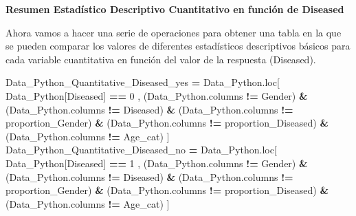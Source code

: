 \documentclass[
  11pt,
  a4paper,
]{article}
\newenvironment{Shaded}{\begin{snugshade}}{\end{snugshade}}
\newcommand{\DecValTok}[1]{\textcolor[rgb]{0.00,0.00,0.81}{#1}}
\newcommand{\NormalTok}[1]{#1}
\newcommand{\OperatorTok}[1]{\textcolor[rgb]{0.81,0.36,0.00}{\textbf{#1}}}
\newcommand{\StringTok}[1]{\textcolor[rgb]{0.31,0.60,0.02}{#1}}
\begin{document}
\vspace{0.21cm}

\textbf{Resumen Estadístico Descriptivo Cuantitativo en función de
Diseased}

Ahora vamos a hacer una serie de operaciones para obtener una tabla en
la que se pueden comparar los valores de diferentes estadísticos
descriptivos básicos para cada variable cuantitativa en función del
valor de la respuesta (Diseased).

\begin{Shaded}
\begin{Highlighting}[]
\NormalTok{Data\_Python\_Quantitative\_Diseased\_yes }\OperatorTok{=}\NormalTok{ Data\_Python.loc[ Data\_Python[}\StringTok{\textquotesingle{}Diseased\textquotesingle{}}\NormalTok{] }\OperatorTok{==} \DecValTok{0}\NormalTok{ , (Data\_Python.columns }\OperatorTok{!=} \StringTok{\textquotesingle{}Gender\textquotesingle{}}\NormalTok{) }\OperatorTok{\&}\NormalTok{ (Data\_Python.columns }\OperatorTok{!=} \StringTok{\textquotesingle{}Diseased\textquotesingle{}}\NormalTok{) }\OperatorTok{\&}\NormalTok{ (Data\_Python.columns }\OperatorTok{!=} \StringTok{\textquotesingle{}proportion\_Gender\textquotesingle{}}\NormalTok{)  }\OperatorTok{\&}\NormalTok{ (Data\_Python.columns }\OperatorTok{!=} \StringTok{\textquotesingle{}proportion\_Diseased\textquotesingle{}}\NormalTok{) }\OperatorTok{\&}\NormalTok{ (Data\_Python.columns }\OperatorTok{!=} \StringTok{\textquotesingle{}Age\_cat\textquotesingle{}}\NormalTok{) ]}
\NormalTok{Data\_Python\_Quantitative\_Diseased\_no }\OperatorTok{=}\NormalTok{ Data\_Python.loc[ Data\_Python[}\StringTok{\textquotesingle{}Diseased\textquotesingle{}}\NormalTok{] }\OperatorTok{==} \DecValTok{1}\NormalTok{ , (Data\_Python.columns }\OperatorTok{!=} \StringTok{\textquotesingle{}Gender\textquotesingle{}}\NormalTok{) }\OperatorTok{\&}\NormalTok{ (Data\_Python.columns }\OperatorTok{!=} \StringTok{\textquotesingle{}Diseased\textquotesingle{}}\NormalTok{) }\OperatorTok{\&}\NormalTok{ (Data\_Python.columns }\OperatorTok{!=} \StringTok{\textquotesingle{}proportion\_Gender\textquotesingle{}}\NormalTok{)  }\OperatorTok{\&}\NormalTok{ (Data\_Python.columns }\OperatorTok{!=} \StringTok{\textquotesingle{}proportion\_Diseased\textquotesingle{}}\NormalTok{) }\OperatorTok{\&}\NormalTok{ (Data\_Python.columns }\OperatorTok{!=} \StringTok{\textquotesingle{}Age\_cat\textquotesingle{}}\NormalTok{) ]}
\end{Highlighting}
\end{Shaded}
\end{document}
